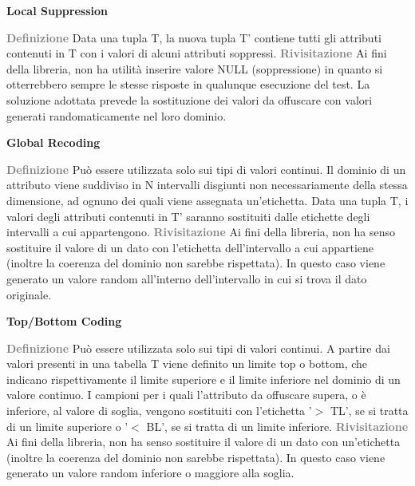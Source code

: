 \noindent\textbf{Local Suppression}
\begin{adjustwidth}{2.5em}{0pt}
 \textbf{\textcolor{gray}{Definizione}} \newline
Data una tupla T, la nuova tupla T’ contiene tutti gli attributi contenuti in T con i valori di alcuni attributi soppressi. \newline
\textbf{\textcolor{gray}{Rivisitazione}} \newline
Ai fini della libreria, non ha utilità inserire valore NULL (soppressione) in quanto si otterrebbero sempre le stesse risposte in qualunque esecuzione del test. La soluzione adottata prevede la sostituzione dei valori da offuscare con valori generati randomaticamente nel loro dominio.
\end{adjustwidth}
\medskip
\noindent\textbf{Global Recoding}
\begin{adjustwidth}{2.5em}{0pt}
 \textbf{\textcolor{gray}{Definizione}} \newline
Può essere utilizzata solo sui tipi di valori continui. Il dominio di un attributo viene	suddiviso in N intervalli disgiunti non necessariamente della stessa dimensione, ad ognuno dei quali viene assegnata un’etichetta. Data una tupla T, i valori degli attributi contenuti in T’ saranno sostituiti dalle etichette degli intervalli a cui appartengono. \newline
\textbf{\textcolor{gray}{Rivisitazione}} \newline
Ai fini della libreria, non ha senso sostituire il valore di un dato con l’etichetta dell'intervallo a cui appartiene (inoltre la coerenza del dominio non sarebbe rispettata). In questo caso viene generato un valore random all’interno dell’intervallo in cui si trova il dato originale. 
\end{adjustwidth}
\medskip
\noindent\textbf{Top/Bottom Coding}
\begin{adjustwidth}{2.5em}{0pt}
 \textbf{\textcolor{gray}{Definizione}} \newline
Può essere utilizzata solo sui tipi di valori continui. A partire dai valori presenti in una tabella T viene definito un limite top o bottom, che indicano rispettivamente il limite superiore e il limite inferiore nel dominio di un valore continuo. I campioni per i quali l’attributo da offuscare supera, o è inferiore, al valore di soglia, vengono sostituiti con l’etichetta '$>$ TL', se si tratta di un limite superiore o '$<$ BL', se si tratta di un limite inferiore. \newline
\textbf{\textcolor{gray}{Rivisitazione}} \newline
Ai fini della libreria, non ha senso sostituire il valore di un dato con un’etichetta (inoltre la coerenza del dominio non sarebbe rispettata). In questo caso viene generato un valore random inferiore o maggiore alla soglia.
\end{adjustwidth}
